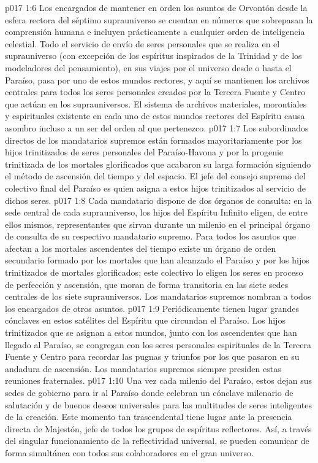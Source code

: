 \vs p017 1:6 Los encargados de mantener en orden los asuntos de Orvontón desde la esfera rectora del séptimo suprauniverso se cuentan en números que sobrepasan la comprensión humana e incluyen prácticamente a cualquier orden de inteligencia celestial. Todo el servicio de envío de seres personales que se realiza en el suprauniverso (con excepción de los espíritus inspirados de la Trinidad y de los modeladores del pensamiento), en sus viajes por el universo desde o hasta el Paraíso, pasa por uno de estos mundos rectores, y aquí se mantienen los archivos centrales para todos los seres personales creados por la Tercera Fuente y Centro que actúan en los suprauniversos. El sistema de archivos materiales, morontiales y espirituales existente en cada uno de estos mundos rectores del Espíritu causa asombro incluso a un ser del orden al que pertenezco.
\vs p017 1:7 Los subordinados directos de los mandatarios supremos están formados mayoritariamente por los hijos trinitizados de seres personales del Paraíso\hyp{}Havona y por la progenie trinitizada de los mortales glorificados que acabaron su larga formación siguiendo el método de ascensión del tiempo y del espacio. El jefe del consejo supremo del colectivo final del Paraíso es quien asigna a estos hijos trinitizados al servicio de dichos seres.
\vs p017 1:8 Cada mandatario dispone de dos órganos de consulta: en la sede central de cada suprauniverso, los hijos del Espíritu Infinito eligen, de entre ellos mismos, representantes que sirvan durante un milenio en el principal órgano de consulta de su respectivo mandatario supremo. Para todos los asuntos que afectan a los mortales ascendentes del tiempo existe un órgano de orden secundario formado por los mortales que han alcanzado el Paraíso y por los hijos trinitizados de mortales glorificados; este colectivo lo eligen los seres en proceso de perfección y ascensión, que moran de forma transitoria en las siete sedes centrales de los siete suprauniversos. Los mandatarios supremos nombran a todos los encargados de otros asuntos.
\vs p017 1:9 \pc Periódicamente tienen lugar grandes cónclaves en estos satélites del Espíritu que circundan el Paraíso. Los hijos trinitizados que se asignan a estos mundos, junto con los ascendentes que han llegado al Paraíso, se congregan con los seres personales espirituales de la Tercera Fuente y Centro para recordar las pugnas y triunfos por los que pasaron en su andadura de ascensión. Los mandatarios supremos siempre presiden estas reuniones fraternales.
\vs p017 1:10 Una vez cada milenio del Paraíso, estos dejan sus sedes de gobierno para ir al Paraíso donde celebran un cónclave milenario de salutación y de buenos deseos universales para las multitudes de seres inteligentes de la creación. Este momento tan trascendental tiene lugar ante la presencia directa de Majestón, jefe de todos los grupos de espíritus reflectores. Así, a través del singular funcionamiento de la reflectividad universal, se pueden comunicar de forma simultánea con todos sus colaboradores en el gran universo.
